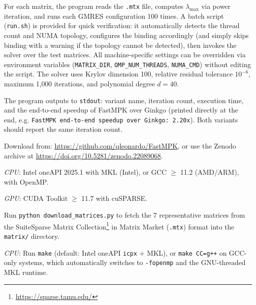 \documentclass[conference]{IEEEtran}
\begin{document}
\artcomp

For each matrix, the program reads the \texttt{.mtx} file, computes $\lambda_{\max}$ via power iteration, and runs each GMRES configuration 100 times. A batch script (\texttt{run.sh}) is provided for quick verification: it automatically detects the thread count and NUMA topology, configures the binding accordingly (and simply skips binding with a warning if the topology cannot be detected), then invokes the solver over the test matrices. All machine-specific settings can be overridden via environment variables (\texttt{MATRIX\_DIR}, \texttt{OMP\_NUM\_THREADS}, \texttt{NUMA\_CMD}) without editing the script. The solver uses Krylov dimension 100, relative residual tolerance $10^{-6}$, maximum 1,000 iterations, and polynomial degree $d=40$.

\artout

The program outputs to \texttt{stdout}: variant name, iteration count, execution time, and the end-to-end speedup of FastMPK over Ginkgo (printed directly at the end, e.g. \texttt{FastMPK end-to-end speedup over Ginkgo: 2.20x}). Both variants should report the same iteration count.


\newpage
\appendixAE

\artin


Download from: \url{https://github.com/qleonardo/FastMPK}, or use the Zenodo archive at \url{https://doi.org/10.5281/zenodo.22089068}.


\emph{CPU}: Intel oneAPI 2025.1 with MKL (Intel), or GCC $\ge$ 11.2 (AMD/ARM), with OpenMP.

\emph{GPU}: CUDA Toolkit $\ge$ 11.7 with cuSPARSE.


Run \texttt{python download\_matrices.py} to fetch the 7 representative matrices from the SuiteSparse Matrix Collection\footnote{\url{https://sparse.tamu.edu/}} in Matrix Market (\texttt{.mtx}) format into the \texttt{matrix/} directory.


\emph{CPU}: Run \texttt{make} (default: Intel oneAPI \texttt{icpx} + MKL), or \texttt{make CC=g++} on GCC-only systems, which automatically switches to \texttt{-fopenmp} and the GNU-threaded MKL runtime.
\end{document}
